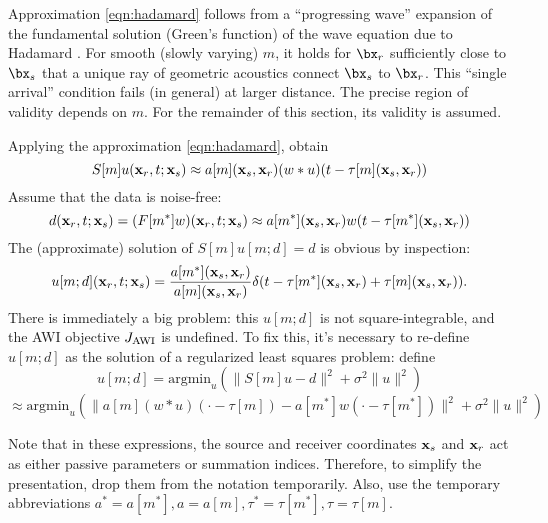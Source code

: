 Approximation \ref{eqn:hadamard} follows from a
``progressing wave''  expansion of the fundamental
solution (Green's function) of the wave equation due to Hadamard
\cite[]{Friedlander:75,Qian:JCP24}. For smooth (slowly varying)
$m$, it holds for $\bx_r$ sufficiently close to $\bx_s$ that a unique ray of
geometric acoustics connect $\bx_s$ to $\bx_r$. This ``single
arrival'' condition fails (in
general) at larger distance. The precise region of validity depends on
$m$. For the remainder of this section, its validity is assumed.

Applying the approximation \ref{eqn:hadamard}, obtain
\begin{equation}
  \label{eqn:spwe}
S[m]u({\bf x}_r,t;{\bf x}_s) \approx a[m]({\bf x}_s,{\bf x}_r) (w*u)(t-\tau[m]({\bf x}_s,{\bf x}_r))
\end{equation}
Assume that the data is noise-free:
$$
d({\bf x}_r,t;{\bf x}_s)=(F[m^*]w) ({\bf x}_r,t;{\bf x}_s) \approx a[m^*]({\bf x}_s,{\bf x}_r) w(t-\tau[m^*]({\bf x}_s,{\bf x}_r))
$$
The (approximate) solution of $S[m]u[m;d]=d$ is obvious by inspection:
\begin{equation}
  \label{eqn:notl2}
  u[m;d]({\bf x}_r,t;{\bf x}_s) = \frac{a[m^*]({\bf x}_s,{\bf x}_r)}{a[m]({\bf x}_s,{\bf x}_r)}\delta(t-\tau[m^*]({\bf x}_s,{\bf x}_r)+\tau[m]({\bf x}_s,{\bf x}_r)).
\end{equation}
There is immediately a big problem: this $u[m;d]$ is not square-integrable, and the AWI objective $J_{\rm AWI}$ is undefined. To fix this, it's necessary to re-define $u[m;d]$ as the solution of a regularized least squares problem: define
\begin{equation}
  \label{eqn:reg}
  u[m;d] = \mbox{argmin}_u (\|S[m]u-d\|^2 + \sigma^2\|u\|^2)
\end{equation}
$$
\approx \mbox{argmin}_u (\|a[m](w*u)(\cdot-\tau[m])-a[m^*]w(\cdot-\tau[m^*])\|^2 + \sigma^2\|u\|^2)
$$

Note that in these expressions, the source and receiver
coordinates ${\bf x}_s$ and ${\bf x}_r$ act as either passive parameters
or summation indices. Therefore, to simplify the presentation, drop them from the notation
temporarily. Also,  use the temporary abbreviations $a^*=a[m^*], a=a[m], \tau^*=\tau[m^*],
\tau=\tau[m]$.

